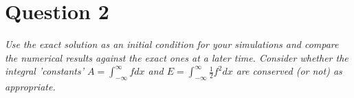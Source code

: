 \section*{Question 2}

\emph{Use the exact solution as an initial condition for your simulations and compare the numerical results
against the exact ones at a later time. Consider whether the integral ’constants’ $A = \int_{-\infty}^\infty f dx$ and $  E =  \int_{-\infty}^\infty \tfrac{1}{2} f^2 dx$ are conserved (or not) as appropriate.}
